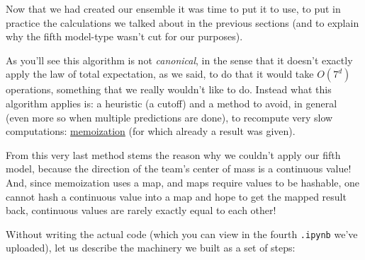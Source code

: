 \documentclass[9pt, a4paper]{IEEEtran}
\begin{document}
    Now that we had created our ensemble it was time to put it to use, to put in practice the calculations we talked about in the previous sections (and to explain why the fifth model-type wasn't cut for our purposes).

    As you'll see this algorithm is not \emph{canonical}, in the sense that it doesn't exactly apply the law of total expectation, as we said, to do that it would take $O(7^d)$ operations, something that we really wouldn't like to do. Instead what this algorithm applies is: a heuristic (a cutoff) and a method to avoid, in general (even more so when multiple predictions are done), to recompute very slow computations: \href{https://en.wikipedia.org/wiki/Memoization}{memoization} (for which already a result was given).

    From this very last method stems the reason why we couldn't apply our fifth model, because the direction of the team's center of mass is a continuous value! And, since memoization uses a map, and maps require values to be hashable, one cannot hash a continuous value into a map and hope to get the mapped result back, continuous values are rarely exactly equal to each other!

    Without writing the actual code (which you can view in the fourth \texttt{.ipynb} we've uploaded), let us describe the machinery we built as a set of steps:
\end{document}
